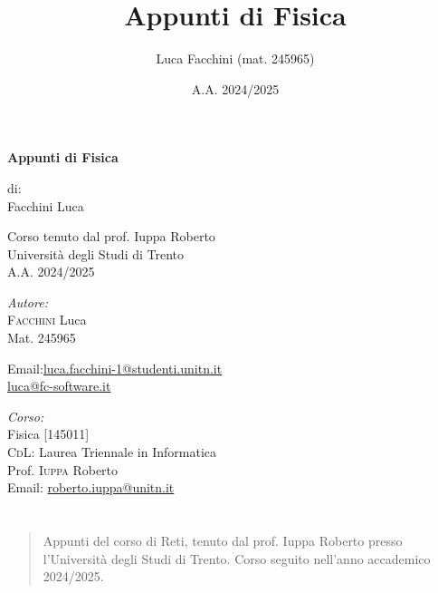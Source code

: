 \documentclass[a4paper,twoside]{book}
\title{Appunti di Fisica}
\author{Luca Facchini (mat. 245965)}
\date{A.A. 2024/2025}
\makeatletter
\newenvironment{abstract}{%
    \if@twocolumn
        \section*{\abstractname}%
    \else
        \begin{center}%
            {\bfseries \abstractname\vspace{-.5em}\vspace{\z@}}%
        \end{center}%
        \small
        \begin{quotation}
    \fi}
    {\if@twocolumn\else\end{quotation}\fi}
\makeatother
\begin{document}
    
    \frontmatter

    \begin{titlepage}
        \centering  %
        {\Huge\textbf{Appunti di Fisica}} \\[1cm] %
        \vspace{1.5cm}
        
        {\normalsize di: } \\[.3cm]
        {\Large Facchini Luca} \\ %
        \vspace{1.5cm}
        

        {\normalsize Corso tenuto dal prof. Iuppa Roberto} \\[0.3cm] %
        {\large Università degli Studi di Trento} \\[1.5cm]
        
        {\large A.A. 2024/2025} \\[3cm] %
        
        \vfill
        \begin{minipage}[t]{0.4\textwidth}
            \begin{flushleft} \normalsize
                \emph{Autore:}\\
                \textsc{Facchini} Luca \\ %
                Mat. 245965 \\
                \vspace{-\baselineskip}
                \begin{tabbing}
                    Email:\= \href{mailto:luca.facchini-1@studenti.unitn.it}{luca.facchini-1@studenti.unitn.it} \\
                        \>  \href{mailto:luca@fc-software.it}{luca@fc-software.it}
                \end{tabbing}
            \end{flushleft}
        \end{minipage}%
        \hfill
        \begin{minipage}[t]{0.4\textwidth}
            \begin{flushleft} \normalsize
                \emph{Corso:}\\
                Fisica [145011] \\
                \textsc{CdL}: Laurea Triennale in Informatica \\
                Prof. \textsc{Iuppa} Roberto \\
                Email: \href{mailto:roberto.iuppa@unitn.it}{roberto.iuppa@unitn.it}
            \end{flushleft}
        \end{minipage}
        \vfill
        \begin{abstract}
            Appunti del corso di Reti, tenuto dal prof. Iuppa Roberto presso l'Università degli Studi di Trento. Corso seguito nell'anno accademico 2024/2025.
        \end{abstract}
        

\end{titlepage}
\end{document}
